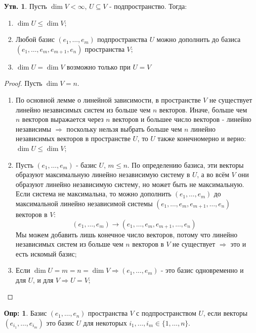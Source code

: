 \documentclass[12pt]{article}
\theoremstyle{definition}
\newtheorem{defn}{Опр:}
\newtheorem{prop}{Утв.}
\begin{document}
\begin{prop}
	Пусть $\dim{V} < \infty$, $U\subseteq V$ - подпространство. Тогда:
	\begin{enumerate}[label=\arabic*)]
		\item $\dim{U} \leq \dim{V}$;
		\item Любой базис $(e_1,\dotsc, e_m)$ подпространства $U$ можно дополнить до базиса $(e_1, \dotsc, e_m, e_{m+1}, e_n)$ пространства $V$;
		\item $\dim{U} = \dim{V}$ возможно только при $U = V$
	\end{enumerate}
\end{prop}
\begin{proof}
	Пусть $\dim{V} = n$.
	\begin{enumerate}[label=\arabic*)]
		\item По основной лемме о линейной зависимости, в пространстве $V$ не существует линейно независимых систем из больше чем $n$ векторов. Иначе, больше чем $n$ векторов выражается через $n$ векторов и большее число векторов - линейно независимы $\Rightarrow$ поскольку нельзя выбрать больше чем $n$ линейно независимых векторов в пространстве $U$, то $U$ также конечномерно и верно: $\dim{U} \leq \dim{V}$;
		\item Пусть $(e_1,\dotsc, e_m)$ - базис $U$, $m \leq n$. По определению базиса, эти векторы образуют максимальную линейно независимую систему в $U$, а во всём $V$ они образуют линейно независимую систему, но может быть не максимальную. Если система не максимальна, то можно дополнить $(e_1,\dotsc,e_m)$ до максимальной линейно независимой системы $(e_1,\dotsc,e_m,e_{m+1},\dotsc, e_n)$ векторов в $V$: 
		$$
			(e_1,\dotsc,e_m) \to (e_1,\dotsc,e_m,e_{m+1},\dotsc, e_n)
		$$
		Мы можем добавить лишь конечное число векторов, потому что линейно независимых систем из больше чем $n$ векторов в $V$ не существует $\Rightarrow$ это и есть искомый базис; 
		\item Если $\dim{U} = m = n = \dim{V} \Rightarrow (e_1, \dotsc, e_m)$ - это базис одновременно и для $U$, и для $V \Rightarrow U = V$;
	\end{enumerate}

\end{proof}
\begin{defn}
	Базис $(e_1, \dotsc, e_n)$ пространства $V$  с подпространством $U$, если векторы $\left(e_{i_1}, \dotsc, e_{i_m}\right)$ это базис $U$ для некоторых $i_1, \dotsc, i_m \in \{1,\dotsc,n\}$. 
\end{defn}
\end{document}
